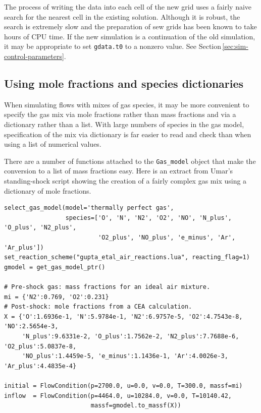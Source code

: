 The process of writing the data into each cell of the new grid uses a fairly naive search for the 
nearest cell in the existing solution.
Although it is robust, the search is extremely slow and the preparation of sew grids has been known
to take hours of CPU time.
If the new simulation is a continuation of the old simulation, it may be appropriate to set
\texttt{gdata.t0} to a nonzero value.  See Section\,\ref{sec:sim-control-parameters}.

\subsection{Using mole fractions and species dictionaries}
\label{sec:MoleFractions}
%
When simulating flows with mixes of gas species, it may be more convenient to specify the gas mix
via mole fractions rather than mass fractions and via a dictionary rather than a list.
With large numbers of species in the gas model, specification of the mix via dictionary is far easier to
read and check than when using a list of numerical values. 

\medskip
There are a number of functions attached to the \texttt{Gas\_model} object that make the
conversion to a list of mass fractions easy.
Here is an extract from Umar's standing-shock script showing the creation of a fairly complex gas mix
using a dictionary of mole fractions.

\medskip\noindent\topbar
{\small %
\begin{verbatim}
select_gas_model(model='thermally perfect gas', 
                 species=['O', 'N', 'N2', 'O2', 'NO', 'N_plus', 'O_plus', 'N2_plus',
                          'O2_plus', 'NO_plus', 'e_minus', 'Ar', 'Ar_plus'])
set_reaction_scheme("gupta_etal_air_reactions.lua", reacting_flag=1)
gmodel = get_gas_model_ptr()

# Pre-shock gas: mass fractions for an ideal air mixture.
mi = {'N2':0.769, 'O2':0.231}
# Post-shock: mole fractions from a CEA calculation.
X = {'O':1.6936e-1, 'N':5.9784e-1, 'N2':6.9757e-5, 'O2':4.7543e-8, 'NO':2.5654e-3, 
     'N_plus':9.6331e-2, 'O_plus':1.7562e-2, 'N2_plus':7.7688e-6, 'O2_plus':5.0837e-8, 
     'NO_plus':1.4459e-5, 'e_minus':1.1436e-1, 'Ar':4.0026e-3, 'Ar_plus':4.4835e-4}

initial = FlowCondition(p=2700.0, u=0.0, v=0.0, T=300.0, massf=mi)
inflow  = FlowCondition(p=4464.0, u=10284.0, v=0.0, T=10140.42,
                        massf=gmodel.to_massf(X))
\end{verbatim}
}
\noindent\bottombar

